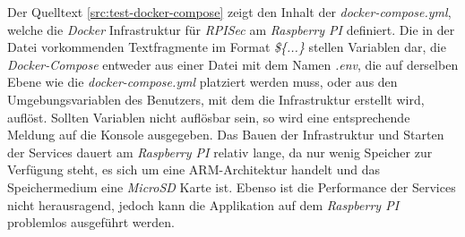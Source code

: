 Der Quelltext \ref{src:test-docker-compose} zeigt den Inhalt der \emph{docker-compose.yml}, welche die \emph{Docker} Infrastruktur für \emph{RPISec} am \emph{Raspberry PI} definiert. Die in der Datei vorkommenden Textfragmente im Format \emph{\$\{...\}} stellen Variablen dar, die \emph{Docker-Compose} entweder aus einer Datei mit dem Namen \emph{.env}, die auf derselben Ebene wie die \emph{docker-compose.yml} platziert werden muss, oder aus den Umgebungsvariablen des Benutzers, mit dem die Infrastruktur erstellt wird, auflöst. Sollten Variablen nicht auflösbar sein, so wird eine entsprechende Meldung auf die Konsole ausgegeben.
\newline
\newline
Das Bauen der Infrastruktur und Starten der Services dauert am \emph{Raspberry PI} relativ lange, da nur wenig Speicher zur Verfügung steht, es sich um eine ARM-Architektur handelt und das Speichermedium eine \emph{MicroSD} Karte ist. Ebenso ist die Performance der Services nicht herausragend, jedoch kann die Applikation auf dem \emph{Raspberry PI} problemlos ausgeführt werden.  